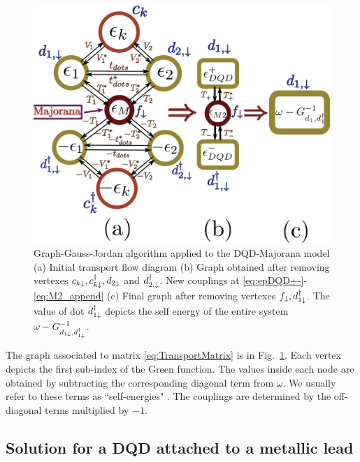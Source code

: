 \documentclass[showpacs,aps,prb,reprint,superscriptaddress]{revtex4-2}
\begin{document}
    \begin{figure}[t]
    \begin{center}
    \centering
     \includegraphics[scale=0.29]{Graficos/Graphs-DQD-M-Pro.png}
    \caption{ Graph-Gauss-Jordan algorithm \cite{spielman_algorithms_2010}  applied to the DQD-Majorana model (a) Initial transport flow diagram  (b) Graph obtained after removing vertexes $c_{k\downarrow},c^\dagger_{k\downarrow}, d_{2\downarrow}$ and $ d^\dagger_{2,\downarrow}$. New couplings at \eqref{eq:epDQD+-}-\eqref{eq:M2_append} (c) Final graph after removing vertexes $f_\downarrow, d^\dagger_{1\downarrow}$. The value of dot $d^\dagger_{1\downarrow}$ depicts the self energy of the entire system $\omega-G^{-1}_{d_{1\downarrow},d_{1\downarrow}^\dagger}$.  \label{fig:GaussJordanGraph}
    }
    
    \end{center}
    \end{figure}


The graph associated to  matrix \eqref{eq:TransportMatrix} is in Fig.\ \ref{fig:GaussJordanGraph}. Each vertex depicts the first sub-index of the Green function. The values inside each node are obtained by subtracting the corresponding diagonal term from $\omega$. We usually refer to these terms as ``self-energies" . The couplings are determined by the  off-diagonal terms multiplied by $-1$. 




\subsection{Solution for a DQD attached to a metallic lead}
\end{document}
